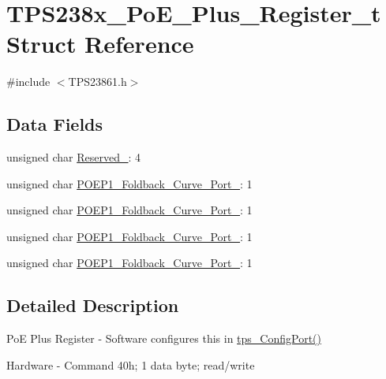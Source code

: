 \hypertarget{struct_t_p_s238x___po_e___plus___register__t}{\section{T\-P\-S238x\-\_\-\-Po\-E\-\_\-\-Plus\-\_\-\-Register\-\_\-t Struct Reference}
\label{struct_t_p_s238x___po_e___plus___register__t}
}


{\ttfamily \#include $<$T\-P\-S23861.\-h$>$}

\subsection*{Data Fields}
\begin{DoxyCompactItemize}
\item 
unsigned char \hyperlink{struct_t_p_s238x___po_e___plus___register__t_a06baf9fa5616267c8ade0ced4a4ff40e}{Reserved\-\_}\-: 4
\item 
unsigned char \hyperlink{struct_t_p_s238x___po_e___plus___register__t_af52a6ea26de1684b88c891f7df8abe44}{P\-O\-E\-P1\-\_\-\-Foldback\-\_\-\-Curve\-\_\-\-Port\-\_}\-: 1
\item 
unsigned char \hyperlink{struct_t_p_s238x___po_e___plus___register__t_a9863f2723790b34426767d00a9895fd4}{P\-O\-E\-P1\-\_\-\-Foldback\-\_\-\-Curve\-\_\-\-Port\-\_}\-: 1
\item 
unsigned char \hyperlink{struct_t_p_s238x___po_e___plus___register__t_aa2114b154275a64af3e2c4640d303129}{P\-O\-E\-P1\-\_\-\-Foldback\-\_\-\-Curve\-\_\-\-Port\-\_}\-: 1
\item 
unsigned char \hyperlink{struct_t_p_s238x___po_e___plus___register__t_a9b6645b3f46d9612adb4a1b733c408cf}{P\-O\-E\-P1\-\_\-\-Foldback\-\_\-\-Curve\-\_\-\-Port\-\_}\-: 1
\end{DoxyCompactItemize}


\subsection{Detailed Description}
Po\-E Plus Register -\/ Software configures this in \hyperlink{_t_p_s23861_8c_a2b787818ef7e374af218c952d3ca8a08}{tps\-\_\-\-Config\-Port()} \par
 Hardware -\/ Command 40h; 1 data byte; read/write \par
\par
 

